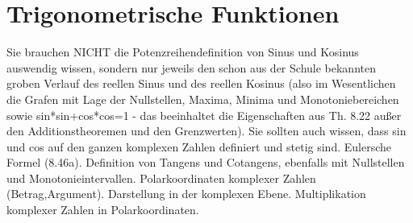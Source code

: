 \section{Trigonometrische Funktionen}
 
Sie brauchen NICHT die Potenzreihendefinition von Sinus und Kosinus auswendig wissen, sondern nur jeweils den schon aus der Schule bekannten groben Verlauf des reellen Sinus und des reellen Kosinus (also im Wesentlichen die Grafen mit Lage der Nullstellen, Maxima, Minima und Monotoniebereichen sowie sin*sin+cos*cos=1 - das beeinhaltet die Eigenschaften aus Th. 8.22 außer den Additionstheoremen und den Grenzwerten). Sie sollten auch wissen, dass sin und cos auf den ganzen komplexen Zahlen definiert und stetig sind. Eulersche Formel (8.46a). Definition von Tangens und Cotangens, ebenfalls mit Nullstellen und Monotonieintervallen. Polarkoordinaten komplexer Zahlen (Betrag,Argument). Darstellung in der komplexen Ebene. Multiplikation komplexer Zahlen in Polarkoordinaten. 